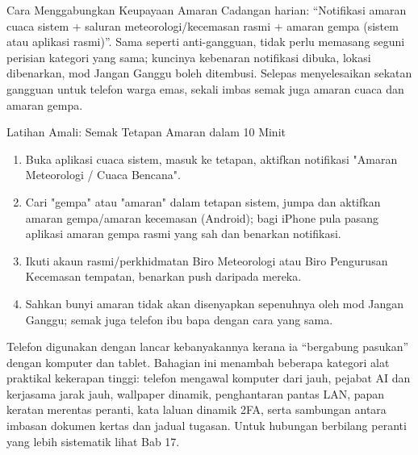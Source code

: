 \begin{tcbinfo}{Cara Menggabungkan Keupayaan Amaran}
Cadangan harian: “Notifikasi amaran cuaca sistem + saluran meteorologi/kecemasan rasmi + amaran gempa (sistem atau aplikasi rasmi)”. Sama seperti anti-gangguan, tidak perlu memasang seguni perisian kategori yang sama; kuncinya kebenaran notifikasi dibuka, lokasi dibenarkan, mod Jangan Ganggu boleh ditembusi. Selepas menyelesaikan sekatan gangguan untuk telefon warga emas, sekali imbas semak juga amaran cuaca dan amaran gempa.

\end{tcbinfo}

\begin{tcbpractice}{Latihan Amali: Semak Tetapan Amaran dalam 10 Minit}
\begin{enumerate}
  \item Buka aplikasi cuaca sistem, masuk ke tetapan, aktifkan notifikasi "Amaran Meteorologi / Cuaca Bencana".
  \item Cari "gempa" atau "amaran" dalam tetapan sistem, jumpa dan aktifkan amaran gempa/amaran kecemasan (Android); bagi iPhone pula pasang aplikasi amaran gempa rasmi yang sah dan benarkan notifikasi.
  \item Ikuti akaun rasmi/perkhidmatan Biro Meteorologi atau Biro Pengurusan Kecemasan tempatan, benarkan push daripada mereka.
  \item Sahkan bunyi amaran tidak akan disenyapkan sepenuhnya oleh mod Jangan Ganggu; semak juga telefon ibu bapa dengan cara yang sama.
\end{enumerate}

\end{tcbpractice}


Telefon digunakan dengan lancar kebanyakannya kerana ia “bergabung pasukan” dengan komputer dan tablet. Bahagian ini menambah beberapa kategori alat praktikal kekerapan tinggi: telefon mengawal komputer dari jauh, pejabat AI dan kerjasama jarak jauh, wallpaper dinamik, penghantaran pantas LAN, papan keratan merentas peranti, kata laluan dinamik 2FA, serta sambungan antara imbasan dokumen kertas dan jadual tugasan. Untuk hubungan berbilang peranti yang lebih sistematik lihat Bab 17.


